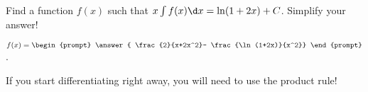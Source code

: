 \documentclass{ximera}
\author{Jim Talamo}
\begin{document}
\begin{exercise}
Find a function $f(x)$ such that $x \int f(x) \d x = \ln(1+2x) +C$.  Simplify your answer!

$f(x) = \begin{prompt} \answer{ \frac{2}{x+2x^2}- \frac{\ln(1+2x)}{x^2}} \end{prompt}$.

\begin{hint}
If you start differentiating right away, you will need to use the product rule!  
\end{hint}

\end{exercise}
\end{document}
